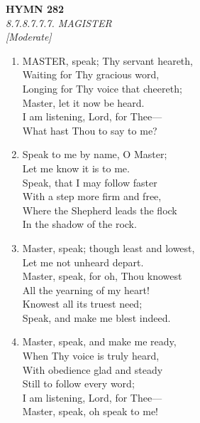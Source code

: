 \documentclass[11pt,a4paper]{article}
\begin{document}
\newpage
\begin{center}
    {\Large \textbf{HYMN 282}}
    \\
    \textit{8.7.8.7.7.7. MAGISTER}
    \\
    \textit{\small [Moderate]}
\end{center}
\vspace{1em}

\begin{enumerate}
    \item MASTER, speak; Thy servant heareth, \\
        Waiting for Thy gracious word, \\
        Longing for Thy voice that cheereth; \\
        Master, let it now be heard. \\
        I am listening, Lord, for Thee--- \\
        What hast Thou to say to me?

    \item Speak to me by name, O Master; \\
        Let me know it is to me. \\
        Speak, that I may follow faster \\
        With a step more firm and free, \\
        Where the Shepherd leads the flock \\
        In the shadow of the rock.

    \item Master, speak; though least and lowest, \\
        Let me not unheard depart. \\
        Master, speak, for oh, Thou knowest \\
        All the yearning of my heart! \\
        Knowest all its truest need; \\
        Speak, and make me blest indeed.

    \item Master, speak, and make me ready, \\
        When Thy voice is truly heard, \\
        With obedience glad and steady \\
        Still to follow every word; \\
        I am listening, Lord, for Thee--- \\
        Master, speak, oh speak to me!

\end{enumerate}
\end{document}
